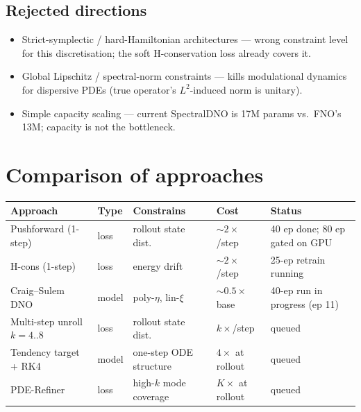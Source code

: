 \documentclass[11pt,letterpaper]{article}
\begin{document}
\subsection{Rejected directions}
\begin{itemize}[leftmargin=1.3em,itemsep=2pt]
  \item Strict-symplectic / hard-Hamiltonian architectures --- wrong
        constraint level for this discretisation; the soft H-conservation
        loss already covers it.
  \item Global Lipschitz / spectral-norm constraints --- kills modulational
        dynamics for dispersive PDEs (true operator's $L^{2}$-induced
        norm is unitary).
  \item Simple capacity scaling --- current SpectralDNO is 17M params
        vs.\ FNO's 13M; capacity is not the bottleneck.
\end{itemize}

\section{Comparison of approaches}

\begin{center}
\footnotesize
\setlength{\tabcolsep}{4pt}
\begin{tabular}{@{}lllll@{}}
\toprule
Approach & Type & Constrains & Cost & Status \\
\midrule
Pushforward (1-step)       & loss   & rollout state dist.\          & $\sim 2\times$/step  & 40 ep done; 80 ep gated on GPU \\
H-cons (1-step)            & loss   & energy drift                  & $\sim 2\times$/step  & 25-ep retrain running \\
Craig--Sulem DNO           & model  & poly-$\eta$, lin-$\xi$        & $\sim 0.5\times$ base  & 40-ep run in progress (ep 11) \\
Multi-step unroll $k{=}4..8$ & loss & rollout state dist.\          & $k\times$/step       & queued \\
Tendency target + RK4      & model  & one-step ODE structure        & $4\times$ at rollout & queued \\
PDE-Refiner                & loss   & high-$k$ mode coverage        & $K\times$ at rollout & queued \\
\bottomrule
\end{tabular}
\end{center}
\end{document}
